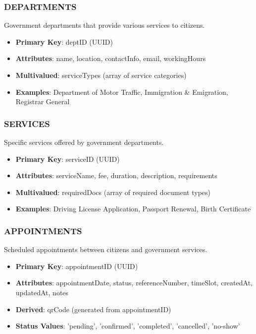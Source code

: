 \documentclass[12pt,a4paper]{article}
\begin{document}
\subsubsection{DEPARTMENTS}
Government departments that provide various services to citizens.
\begin{itemize}[leftmargin=*]
    \item \textbf{Primary Key}: deptID (UUID)
    \item \textbf{Attributes}: name, location, contactInfo, email, workingHours
    \item \textbf{Multivalued}: serviceTypes (array of service categories)
    \item \textbf{Examples}: Department of Motor Traffic, Immigration \& Emigration, Registrar General
\end{itemize}

\subsubsection{SERVICES}
Specific services offered by government departments.
\begin{itemize}[leftmargin=*]
    \item \textbf{Primary Key}: serviceID (UUID)
    \item \textbf{Attributes}: serviceName, fee, duration, description, requirements
    \item \textbf{Multivalued}: requiredDocs (array of required document types)
    \item \textbf{Examples}: Driving License Application, Passport Renewal, Birth Certificate
\end{itemize}

\subsubsection{APPOINTMENTS}
Scheduled appointments between citizens and government services.
\begin{itemize}[leftmargin=*]
    \item \textbf{Primary Key}: appointmentID (UUID)
    \item \textbf{Attributes}: appointmentDate, status, referenceNumber, timeSlot, createdAt, updatedAt, notes
    \item \textbf{Derived}: qrCode (generated from appointmentID)
    \item \textbf{Status Values}: 'pending', 'confirmed', 'completed', 'cancelled', 'no-show'
\end{itemize}
\end{document}
